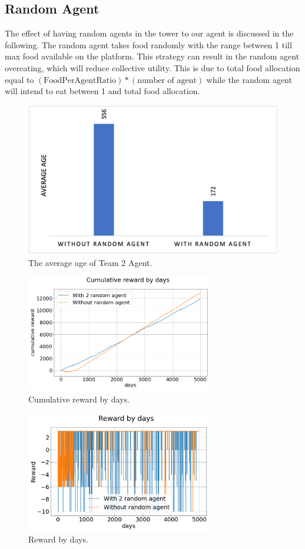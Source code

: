 \subsection{Random Agent}
The effect of having random agents in the tower to our agent is discussed in the following. The random agent takes food randomly with the range between 1 till max food available on the platform. This strategy can result in the random agent overeating, which will reduce collective utility. This is due to total food allocation equal to $(\textrm{FoodPerAgentRatio}) * (\textrm{number of agent})$ while the random agent will intend to eat between 1 and total food allocation.
\begin{figure}
\centering
\includegraphics{004_team_2_agent_design/team2avage}
\caption{The average age of Team 2 Agent.}
\label{team2av}
\end{figure}
\begin{figure}
\centering
\includegraphics{004_team_2_agent_design/cumrewardbydays}
\caption{Cumulative reward by days.}
\label{cumreward-team2}
\end{figure}
\begin{figure}
\centering
\includegraphics{004_team_2_agent_design/rewardbydays}
\caption{Reward by days.}
\label{dayreward-team2}
\end{figure}
